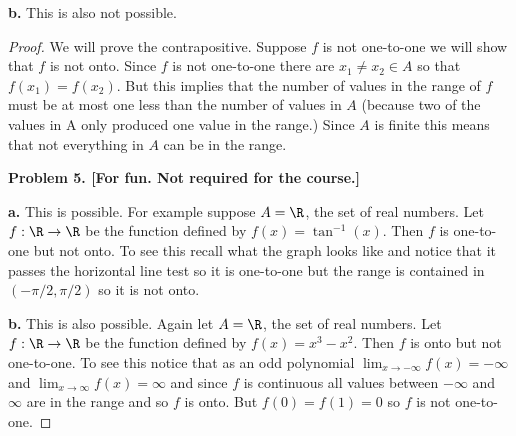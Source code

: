 \documentclass[oneside,12pt]{amsart}
\begin{document}
\textbf{b.} This is also not possible.
\begin{proof}
We will prove the contrapositive. Suppose $f$ is not one-to-one we will show
that $f$ is not onto. Since $f$ is not one-to-one there are $x_1\not=x_2\in A$
so that $f(x_1) = f(x_2)$. But this implies that the number of values in
the range of $f$ must be at most one less than the number of values in $A$
(because two of the values in A only produced one value in the range.) Since
$A$ is finite this means that not everything in $A$ can be in the range.

\medskip

\textbf{Problem 5. [For fun. Not required for the course.]}

\textbf{a.} This is possible. For example suppose $A=\R$, the set of real
numbers. Let $f:\R\to\R$ be the function defined by $f(x)=\tan^{-1}(x)$.
Then $f$ is one-to-one but not onto. To see this recall what the graph looks
like and notice that it passes the horizontal line test so it is one-to-one
but the range is contained in $(-\pi/2, \pi/2)$ so it is not onto.

\textbf{b.} This is also possible. Again let $A=\R$, the set of real
numbers. Let $f:\R\to\R$ be the function defined by $f(x) = x^3 - x^2$. Then
$f$ is onto but not one-to-one. To see this notice that as an odd polynomial
$\lim_{x\to-\infty}f(x) = -\infty$ and $\lim_{x\to\infty}f(x) = \infty$ and
since $f$ is continuous all values between $-\infty$ and $\infty$ are in the
range and so $f$ is onto. But $f(0) = f(1) = 0$ so $f$ is not one-to-one.
\end{proof}
\end{document}
